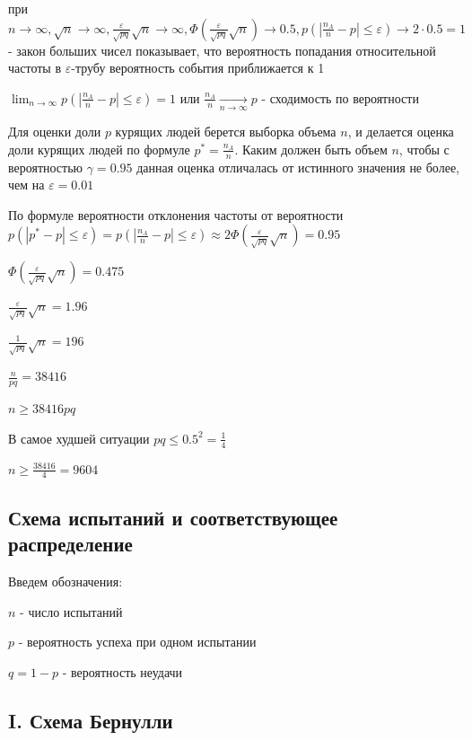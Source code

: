 \documentclass[12pt]{article}
\begin{document}
    при $n \to \infty, \sqrt{n} \to \infty, \frac{\varepsilon}{\sqrt{pq}} \sqrt{n} \to \infty, \Phi\left(\frac{\varepsilon}{\sqrt{pq}}\sqrt{n}\right) \to 0.5, p\left(|\frac{n_A}{n} - p| \leq \varepsilon\right) \to 2 \cdot 0.5 = 1$ - закон больших чисел показывает, что вероятность попадания относительной частоты в $\varepsilon$-трубу вероятность события приближается к 1

    $\lim_{n \to \infty} p\left(|\frac{n_A}{n} - p| \leq \varepsilon\right) = 1$ или $\frac{n_A}{n} \underset{n \to \infty}{\longrightarrow} p$ - сходимость по вероятности

    \Ex Для оценки доли $p$ курящих людей берется выборка объема $n$, и делается оценка доли курящих людей по формуле $p^* = \frac{n_A}{n}$.
    Каким должен быть объем $n$, чтобы с вероятностью $\gamma = 0.95$ данная оценка отличалась от истинного значения не более, чем на $\varepsilon = 0.01$

    По формуле вероятности отклонения частоты от вероятности $p(|p^* - p| \leq \varepsilon) = p\left(|\frac{n_A}{n} - p| \leq \varepsilon\right) \approx 2\Phi\left(\frac{\varepsilon}{\sqrt{pq}}\sqrt{n}\right) = 0.95$

    $\Phi\left(\frac{\varepsilon}{\sqrt{pq}}\sqrt{n}\right) = 0.475$

    $\frac{\varepsilon}{\sqrt{pq}}\sqrt{n} = 1.96$

    $\frac{1}{\sqrt{pq}}\sqrt{n} = 196$

    $\frac{n}{pq} = 38416$

    $n \geq 38416 pq$

    В самое худшей ситуации $pq \leq 0.5^2 = \frac{1}{4}$

    $n \geq \frac{38416}{4} = 9604$


    \subsection{Схема испытаний и соответствующее распределение}

    Введем обозначения:

    $n$ - число испытаний

    $p$ - вероятность успеха при одном испытании

    $q = 1 - p$ - вероятность неудачи

    \subsection{I. Схема Бернулли}
\end{document}
